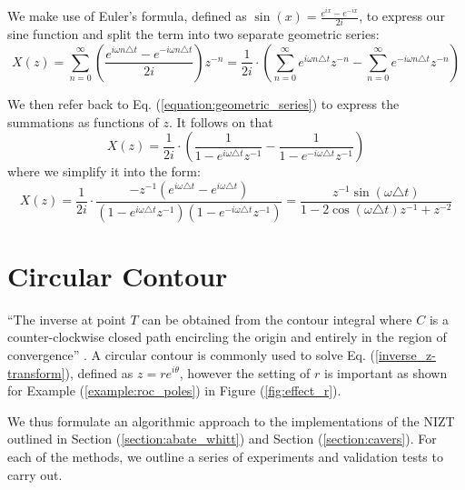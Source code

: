 \documentclass[a4paper]{report}
\begin{document}
We make use of Euler's formula, defined as $\sin(x) = \frac{e^{ix} - e^{-ix}}{2i}$, to express our sine function and split the term into two separate geometric series:
\begin{equation}
	X(z) = \sum^{\infty}_{n = 0} \left( \frac{e^{i\omega n\triangle t} - e^{-i\omega n\triangle t}}{2i} \right) z^{-n} = \frac{1}{2i}\cdot\left( \sum^{\infty}_{n = 0} e^{i\omega n\triangle t} z^{-n} - \sum^{\infty}_{n = 0} e^{-i\omega n\triangle t}z^{-n}\right)
\end{equation}
 
 We then refer back to Eq. (\ref{equation:geometric_series}) to express the summations as functions of $z$. It follows on that
\begin{equation}
	X(z) = \frac{1}{2i}\cdot \left( \frac{1}{1 - e^{i\omega \triangle t}z^{-1}} - \frac{1}{1 - e^{-i\omega \triangle t}z^{-1}} \right)
\end{equation}
where we simplify it into the form:
\begin{equation}
X(z) = \frac{1}{2i} \cdot \frac{ -z^{-1}(e^{i\omega \triangle t} - e^{i\omega \triangle t})}{(1 - e^{i\omega \triangle t}z^{-1})(1 - e^{-i\omega \triangle t}z^{-1})} = \frac{z^{-1}\sin(\omega \triangle t)}{1 - 2\cos(\omega\triangle t)z^{-1} + z^{-2}}
\end{equation}

\section{Circular Contour}\label{section:circular_contour}
``The inverse at point $T$ can be obtained from the contour integral where $C$ is a counter-clockwise closed path encircling the origin and entirely in the region of convergence'' \citep{horvath2020numerical}. A circular contour is commonly used to solve Eq. (\ref{inverse_z-transform}), defined as $z = re^{i\theta}$, however the setting of $r$ is important as shown for Example (\ref{example:roc_poles}) in Figure (\ref{fig:effect_r}).

We thus formulate an algorithmic approach to the implementations of the NIZT outlined in Section (\ref{section:abate_whitt}) and Section (\ref{section:cavers}). For each of the methods, we outline a series of experiments and validation tests to carry out.
\end{document}

